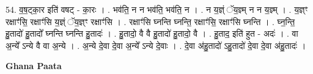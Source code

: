 \documentclass[17pt]{extarticle}
\begin{document}
54. व॒ष॒ट्का॒र इति॑ वषट् - का॒रः । . भव॑ति॒ न न भव॑ति॒ भव॑ति॒ न । . न य॒ज्ञ्ं ॅय॒ज्ञ्म् न न य॒ज्ञ्म् । . य॒ज्ञ्ꣳ रक्षाꣳ॑सि॒ रक्षाꣳ॑सि य॒ज्ञ्ं ॅय॒ज्ञ्ꣳ रक्षाꣳ॑सि । . रक्षाꣳ॑सि घ्नन्ति घ्नन्ति॒ रक्षाꣳ॑सि॒ रक्षाꣳ॑सि घ्नन्ति । . घ्न॒न्ति॒ हु॒तादो॑ हु॒तादो᳚ घ्नन्ति घ्नन्ति हु॒तादः॑ । . हु॒तादो॒ वै वै हु॒तादो॑ हु॒तादो॒ वै । . हु॒ताद॒ इति॑ हुत - अदः॑ । . वा अ॒न्ये᳚ ऽन्ये वै वा अ॒न्ये । . अ॒न्ये दे॒वा दे॒वा अ॒न्ये᳚ ऽन्ये दे॒वाः । . दे॒वा अ॑हु॒तादो॑ ऽहु॒तादो॑ दे॒वा दे॒वा अ॑हु॒तादः॑ । \newline

\textbf{Ghana Paata } \newline
\end{document}
